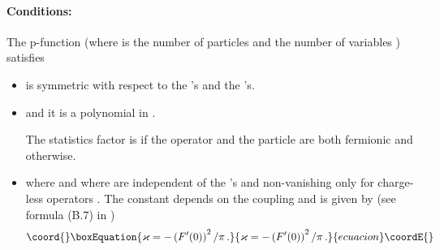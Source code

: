 \documentclass[a4paper,a4paper]{article}
\begin{document}
\paragraph{Conditions:\label{p}}

The p-function \coordHE{}
(where \coordHE{} is the number of particles and the number of variables \myHighlight{$\theta $}\coordHE{})
satisfies

\begin{itemize}
\item[\myHighlight{$(i^{\prime })$}\coordHE{}]  \coordHE{} is symmetric with respect to the \myHighlight{$\theta $}\coordHE{}'s and the \coordHE{}'s.

\item[\myHighlight{$(ii^{\prime })$}\coordHE{}]  \coordHE{} and it is a polynomial in \coordHE{}.

The statistics factor \coordHE{} is \coordHE{} if the operator \coordHE{} and the particle \coordHE{} are both fermionic and \coordHE{} otherwise.

\item[\myHighlight{$(iii^{\prime })$}\coordHE{}]  \coordHE{}

where \coordHE{} and where \coordHE{} are independent of the \coordHE{}'s and non-vanishing only
for charge-less operators \coordHE{}. The constant \myHighlight{$\varkappa $}\coordHE{}
depends on the coupling and is given by (see formula (B.7) in \cite{BFKZ}) 
\begin{equation}\coord{}\boxEquation{
\varkappa =-\left( F^{\prime }(0)\right) ^{2}/\pi \,.  \label{3.1}
}{
\varkappa =-\left( F^{\prime }(0)\right) ^{2}/\pi \,.  }{ecuacion}\coordE{}\end{equation}


\end{itemize}
\end{document}

